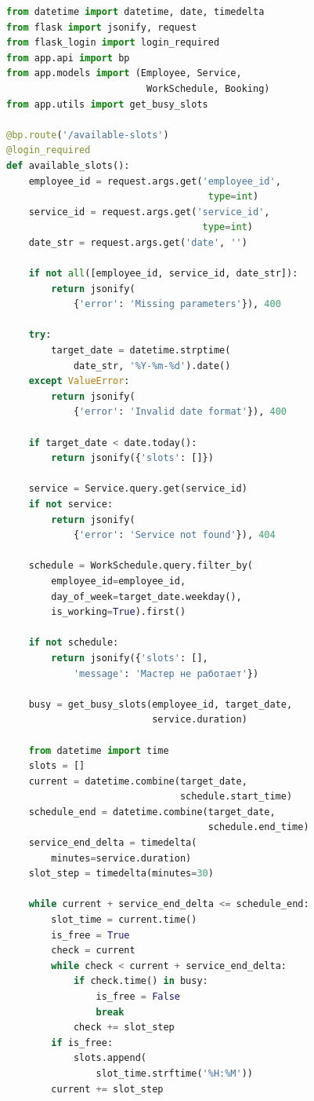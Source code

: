 \documentclass[14pt,a4paper,oneside]{extarticle}
\begin{document}
\begin{lstlisting}[language=Python, caption={REST API маршруты (app/api/routes.py)}, label={lst:full_api}]
from datetime import datetime, date, timedelta
from flask import jsonify, request
from flask_login import login_required
from app.api import bp
from app.models import (Employee, Service,
                         WorkSchedule, Booking)
from app.utils import get_busy_slots

@bp.route('/available-slots')
@login_required
def available_slots():
    employee_id = request.args.get('employee_id',
                                    type=int)
    service_id = request.args.get('service_id',
                                   type=int)
    date_str = request.args.get('date', '')

    if not all([employee_id, service_id, date_str]):
        return jsonify(
            {'error': 'Missing parameters'}), 400

    try:
        target_date = datetime.strptime(
            date_str, '%Y-%m-%d').date()
    except ValueError:
        return jsonify(
            {'error': 'Invalid date format'}), 400

    if target_date < date.today():
        return jsonify({'slots': []})

    service = Service.query.get(service_id)
    if not service:
        return jsonify(
            {'error': 'Service not found'}), 404

    schedule = WorkSchedule.query.filter_by(
        employee_id=employee_id,
        day_of_week=target_date.weekday(),
        is_working=True).first()

    if not schedule:
        return jsonify({'slots': [],
            'message': 'Мастер не работает'})

    busy = get_busy_slots(employee_id, target_date,
                          service.duration)

    from datetime import time
    slots = []
    current = datetime.combine(target_date,
                               schedule.start_time)
    schedule_end = datetime.combine(target_date,
                                    schedule.end_time)
    service_end_delta = timedelta(
        minutes=service.duration)
    slot_step = timedelta(minutes=30)

    while current + service_end_delta <= schedule_end:
        slot_time = current.time()
        is_free = True
        check = current
        while check < current + service_end_delta:
            if check.time() in busy:
                is_free = False
                break
            check += slot_step
        if is_free:
            slots.append(
                slot_time.strftime('%H:%M'))
        current += slot_step


\end{lstlisting}
\end{document}
